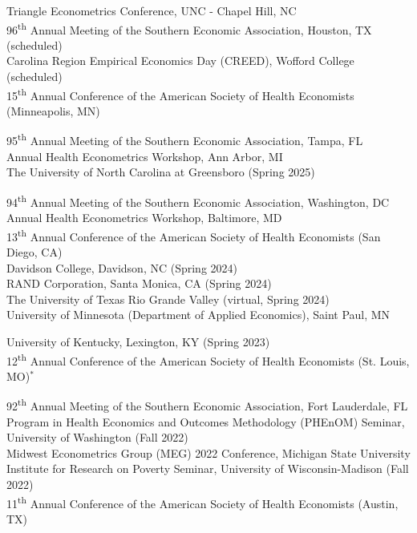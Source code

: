\documentclass[12pt,letterpaper]{article}
\begin{document}
\begin{description}[font=\mdseries]
	\item[2026] Triangle Econometrics Conference, UNC - Chapel Hill, NC\\
	96\textsuperscript{th} Annual Meeting of the Southern Economic Association, Houston, TX (scheduled)\\
	Carolina Region Empirical Economics Day (CREED), Wofford College (scheduled)\\
	15\textsuperscript{th} Annual Conference of the American Society of Health Economists (Minneapolis, MN)
	\item[2025] 95\textsuperscript{th} Annual Meeting of the Southern Economic Association, Tampa, FL \\ 
	Annual Health Econometrics Workshop, Ann Arbor, MI\\
	The University of North Carolina at Greensboro (Spring 2025)
	\item[2024]  94\textsuperscript{th} Annual Meeting of the Southern Economic Association, Washington, DC \\ 
	Annual Health Econometrics Workshop, Baltimore, MD\\
	13\textsuperscript{th} Annual Conference of the American Society of Health Economists (San Diego, CA) \\
	Davidson College, Davidson, NC (Spring 2024) \\
	RAND Corporation, Santa Monica, CA (Spring 2024) \\
	The University of Texas Rio Grande Valley (virtual, Spring 2024) \\
	University of Minnesota (Department of Applied Economics), Saint Paul, MN
	\item[2023]  University of Kentucky, Lexington, KY (Spring 2023) \\
	12\textsuperscript{th} Annual Conference of the American Society of Health Economists (St. Louis, MO)$^*$
	\item[2022]  92\textsuperscript{th} Annual Meeting of the Southern Economic Association, Fort Lauderdale, FL \\ 
	Program in Health Economics and Outcomes Methodology (PHEnOM) Seminar, University of Washington (Fall 2022) \\
	Midwest Econometrics Group (MEG) 2022 Conference, Michigan State University\\ 
	Institute for Research on Poverty Seminar, University of Wisconsin-Madison (Fall 2022) \\ 
	11\textsuperscript{th} Annual Conference of the American Society of Health Economists (Austin, TX)\\

\end{description}
\end{document}
